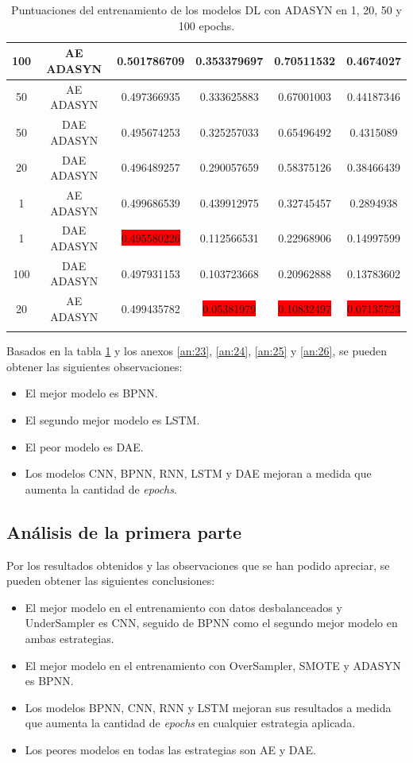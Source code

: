 \begin{longtable}{|c|c|c|c|c|c|}
	100 & AE ADASYN & 0.501786709 & 0.353379697 & 0.70511532 & 0.4674027\\ \hline
	50 & AE ADASYN & 0.497366935 & 0.333625883 & 0.67001003 & 0.44187346\\ \hline
	50 & DAE ADASYN & 0.495674253 & 0.325257033 & 0.65496492 & 0.4315089\\ \hline
	20 & DAE ADASYN & 0.496489257 & 0.290057659 & 0.58375126 & 0.38466439\\ \hline
	1 & AE ADASYN & 0.499686539 & 0.439912975 & 0.32745457 & 0.2894938\\ \hline
	1 & DAE ADASYN & \colorbox{red}{0.495580226} & 0.112566531 & 0.22968906 & 0.14997599\\ \hline
	100 & DAE ADASYN & 0.497931153 & 0.103723668 & 0.20962888 & 0.13783602\\ \hline
	20 & AE ADASYN & 0.499435782 & \colorbox{red}{0.05381979} & \colorbox{red}{0.10832497} & \colorbox{red}{0.07135723}\\ \hline
	\caption{Puntuaciones del entrenamiento de los modelos DL con ADASYN en 1, 20, 50 y 100 epochs.}
	\label{t:16}
\end{longtable}

Basados en la tabla \ref{t:16} y los anexos \ref{an:23}, \ref{an:24}, \ref{an:25} y \ref{an:26}, se pueden obtener las siguientes observaciones:
\begin{itemize}
	\item El mejor modelo es BPNN.
	\item El segundo mejor modelo es LSTM.
	\item El peor modelo es DAE.
	\item Los modelos CNN, BPNN, RNN, LSTM y DAE mejoran a medida que aumenta la cantidad de \textit{epochs}.
\end{itemize}

\subsection{An\'{a}lisis de la primera parte}

  Por los resultados obtenidos y las observaciones que se han podido apreciar, se pueden obtener las siguientes conclusiones:
  \begin{itemize}
  	\item El mejor modelo en el entrenamiento con datos desbalanceados y UnderSampler es CNN, seguido de BPNN como el segundo mejor modelo en ambas estrategias.
  	\item El mejor modelo en el entrenamiento con OverSampler, SMOTE y ADASYN es BPNN.
  	\item Los modelos BPNN, CNN, RNN y LSTM mejoran sus resultados a medida que aumenta la cantidad de \textit{epochs} en cualquier estrategia aplicada.
  	\item Los peores modelos en todas las estrategias son AE y DAE.
  \end{itemize}

